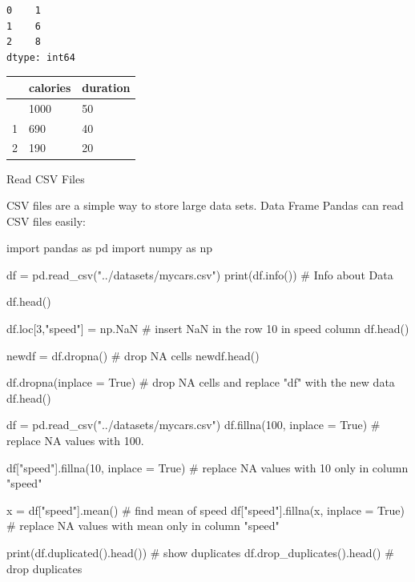 \documentclass[
  letterpaper,
  DIV=11,
  numbers=noendperiod]{scrreprt}
\newenvironment{Shaded}{\begin{snugshade}}{\end{snugshade}}
\newcommand{\BuiltInTok}[1]{\textcolor[rgb]{0.00,0.23,0.31}{#1}}
\newcommand{\CommentTok}[1]{\textcolor[rgb]{0.37,0.37,0.37}{#1}}
\newcommand{\DecValTok}[1]{\textcolor[rgb]{0.68,0.00,0.00}{#1}}
\newcommand{\ImportTok}[1]{\textcolor[rgb]{0.00,0.46,0.62}{#1}}
\newcommand{\NormalTok}[1]{\textcolor[rgb]{0.00,0.23,0.31}{#1}}
\newcommand{\OperatorTok}[1]{\textcolor[rgb]{0.37,0.37,0.37}{#1}}
\newcommand{\StringTok}[1]{\textcolor[rgb]{0.13,0.47,0.30}{#1}}
\newcommand{\VariableTok}[1]{\textcolor[rgb]{0.07,0.07,0.07}{#1}}
\begin{document}
\begin{verbatim}
0    1
1    6
2    8
dtype: int64
\end{verbatim}

\begin{longtable}[]{@{}lll@{}}
\toprule\noalign{}
& calories & duration \\
\midrule\noalign{}
\endhead
\bottomrule\noalign{}
\endlastfoot
0 & 1000 & 50 \\
1 & 690 & 40 \\
2 & 190 & 20 \\
\end{longtable}

Read CSV Files

CSV files are a simple way to store large data sets. Data Frame Pandas
can read CSV files easily:

\begin{Shaded}
\begin{Highlighting}[]
\ImportTok{import}\NormalTok{ pandas }\ImportTok{as}\NormalTok{ pd}
\ImportTok{import}\NormalTok{ numpy }\ImportTok{as}\NormalTok{ np}

\NormalTok{df }\OperatorTok{=}\NormalTok{ pd.read\_csv(}\StringTok{"../datasets/mycars.csv"}\NormalTok{)}
\BuiltInTok{print}\NormalTok{(df.info()) }\CommentTok{\# Info about Data}

\NormalTok{df.head()}

\NormalTok{df.loc[}\DecValTok{3}\NormalTok{,}\StringTok{"speed"}\NormalTok{] }\OperatorTok{=}\NormalTok{ np.NaN }\CommentTok{\# insert NaN in the row 10 in speed column}
\NormalTok{df.head()}

\NormalTok{newdf }\OperatorTok{=}\NormalTok{ df.dropna() }\CommentTok{\# drop NA cells}
\NormalTok{newdf.head()}

\NormalTok{df.dropna(inplace }\OperatorTok{=} \VariableTok{True}\NormalTok{) }\CommentTok{\# drop NA cells and replace "df" with the new data}
\NormalTok{df.head()}

\NormalTok{df }\OperatorTok{=}\NormalTok{ pd.read\_csv(}\StringTok{"../datasets/mycars.csv"}\NormalTok{)}
\NormalTok{df.fillna(}\DecValTok{100}\NormalTok{, inplace }\OperatorTok{=} \VariableTok{True}\NormalTok{) }\CommentTok{\# replace NA values with 100.}

\NormalTok{df[}\StringTok{"speed"}\NormalTok{].fillna(}\DecValTok{10}\NormalTok{, inplace }\OperatorTok{=} \VariableTok{True}\NormalTok{) }\CommentTok{\# replace NA values with 10 only in column "speed"}

\NormalTok{x }\OperatorTok{=}\NormalTok{ df[}\StringTok{"speed"}\NormalTok{].mean() }\CommentTok{\# find mean of speed}
\NormalTok{df[}\StringTok{"speed"}\NormalTok{].fillna(x, inplace }\OperatorTok{=} \VariableTok{True}\NormalTok{) }\CommentTok{\# replace NA values with mean only in column "speed"}


\BuiltInTok{print}\NormalTok{(df.duplicated().head()) }\CommentTok{\# show duplicates}
\NormalTok{df.drop\_duplicates().head() }\CommentTok{\# drop duplicates}
\end{Highlighting}
\end{Shaded}
\end{document}
